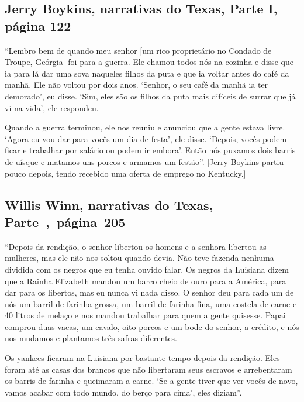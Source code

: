 \subsection{Jerry Boykins, narrativas do Texas, Parte I, página 122} \label{ref30}

``Lembro bem de quando meu senhor {[}um rico proprietário no Condado de
Troupe, Geórgia{]} foi para a guerra. Ele chamou todos nós na cozinha e
disse que ia para lá dar uma sova naqueles filhos da puta e que ia
voltar antes do café da manhã. Ele não voltou por dois anos. `Senhor, o
seu café da manhã ia ter demorado', eu disse. `Sim, eles são os filhos
da puta mais difíceis de surrar que já vi na vida', ele respondeu.

Quando a guerra terminou, ele nos reuniu e anunciou que a gente estava
livre. `Agora eu vou dar para vocês um dia de festa', ele disse.
`Depois, vocês podem ficar e trabalhar por salário ou podem ir embora'.
Então nós puxamos dois barris de uísque e matamos uns porcos e armamos
um festão''. {[}Jerry Boykins partiu pouco depois, tendo recebido uma
oferta de emprego no Kentucky.{]}

\subsection{Willis Winn, narrativas do Texas, Parte~,~página~205}
\label{ref305}

``Depois da rendição, o senhor libertou os homens e a senhora libertou
as mulheres, mas ele não nos soltou quando devia. Não teve fazenda
nenhuma dividida com os negros que eu tenha ouvido falar. Os negros da
Luisiana dizem que a Rainha Elizabeth mandou um barco cheio de ouro para
a América, para dar para os libertos, mas eu nunca vi nada disso. O
senhor deu para cada um de nós um barril de farinha grossa, um barril de
farinha fina, uma costela de carne e 40 litros de melaço e nos mandou
trabalhar para quem a gente quisesse. Papai comprou duas vacas, um
cavalo, oito porcos e um bode do senhor, a crédito, e nós nos mudamos e
plantamos três safras diferentes.

Os yankees ficaram na Luisiana por bastante tempo depois da rendição.
Eles foram até as casas dos brancos que não libertaram seus escravos e
arrebentaram os barris de farinha e queimaram a carne. `Se a gente tiver
que ver vocês de novo, vamos acabar com todo mundo, do berço para cima',
eles diziam''.

